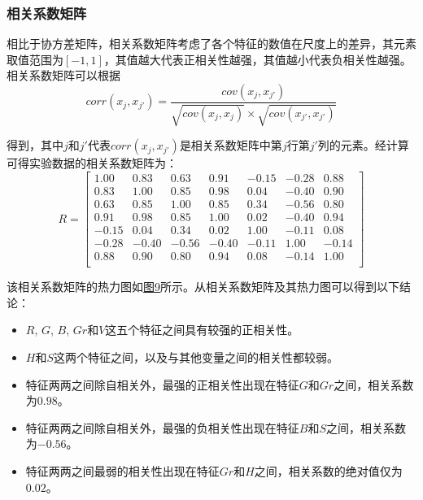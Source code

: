 \documentclass[UTF8]{ctexart}
\begin{document}
	\subsubsection{相关系数矩阵}
	相比于协方差矩阵，相关系数矩阵考虑了各个特征的数值在尺度上的差异，其元素取值范围为$[-1, 1]$，其值越大代表正相关性越强，其值越小代表负相关性越强。相关系数矩阵可以根据
	\begin{equation*}
	corr(x_j, x_{j'}) = \frac{cov(x_j, x_{j'})}{\sqrt{cov(x_j, x_j)} \times \sqrt{cov(x_{j'}, x_{j'})}}
	\end{equation*}
	
	得到，其中$j$和$j'$代表$corr(x_j, x_{j'})$是相关系数矩阵中第$j$行第$j'$列的元素。经计算可得实验数据的相关系数矩阵为：
	\begin{equation*}
	R = 
	\begin{bmatrix}
	1.00 &   0.83 & 0.63 & 0.91& -0.15& -0.28 & 0.88 \\
	0.83 & 1.00  &  0.85 & 0.98 & 0.04& -0.40 &  0.90 \\
	0.63 & 0.85 & 1.00  &  0.85 & 0.34& -0.56 & 0.80 \\
	0.91 & 0.98 & 0.85 & 1.00  &  0.02 &-0.40 & 0.94 \\
	-0.15 & 0.04 & 0.34 & 0.02 & 1.00 &  -0.11&  0.08 \\
	-0.28 & -0.40 & -0.56 & -0.40 & -0.11 & 1.00 &  -0.14 \\
	0.88 & 0.90  & 0.80  & 0.94 & 0.08 & -0.14 & 1.00 \\
	\end{bmatrix}
	\end{equation*}
	
	该相关系数矩阵的热力图如\hyperref[Fig.9]{图9}所示。从相关系数矩阵及其热力图可以得到以下结论：
	\begin{itemize}
		\item $R$, $G$, $B$, $Gr$和$V$这五个特征之间具有较强的正相关性。
		\item $H$和$S$这两个特征之间，以及与其他变量之间的相关性都较弱。
		\item 特征两两之间除自相关外，最强的正相关性出现在特征$G$和$Gr$之间，相关系数为$0.98$。
		\item 特征两两之间除自相关外，最强的负相关性出现在特征$B$和$S$之间，相关系数为$-0.56$。
		\item 特征两两之间最弱的相关性出现在特征$Gr$和$H$之间，相关系数的绝对值仅为$0.02$。
	\end{itemize} 
	
\end{document}
